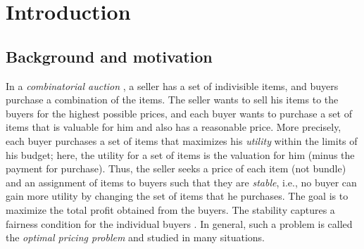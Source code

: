 \documentclass[letterpaper]{article}
\theoremstyle{definition}
\newcommand{\COMM}[2]{{
\begin{CJK}{UTF8}{ipxm}
\ifthenelse{\equal{#1}{TM}}{\color{blue}}{
\ifthenelse{\equal{#1}{YK}}{\color{red}}{
\ifthenelse{\equal{#1}{HS}}{\color{cyan}}{
\ifthenelse{\equal{#1}{KK}}{\color{magenta}}}}}
[#1: #2]
\end{CJK}
}}
\begin{document}
\section{Introduction}
\label{sec:introduction}

\subsection{Background and motivation}
In a \emph{combinatorial auction} \cite{nisan2007algorithmic11,cramton2006combinatorial},
a seller has a set of indivisible items, and buyers purchase a combination of the items.
The seller wants to sell his items to the buyers for the highest possible prices, and
each buyer wants to purchase a set of items that is valuable for him and also has a reasonable price.
More precisely, each buyer purchases a set of items that maximizes his \emph{utility} within the limits of his budget; here, the utility for a set of items is the valuation for him (minus the payment for purchase).
Thus, the seller seeks a price of each item (not bundle) and an assignment of items to buyers such that they are \emph{stable}, i.e., no buyer can gain more utility by changing the set of items that he purchases.
The goal is to maximize the total profit obtained from the buyers.
The stability captures a fairness condition for the individual buyers \cite{goldberg2003envy,guruswami2005profit,cheung2008approximation,anshelevich2015envy}. %
In general, such a problem is called the \emph{optimal pricing problem} and studied in many situations.


\end{document}
